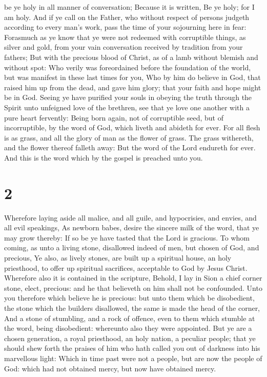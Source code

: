 be ye holy in all manner of conversation;  Because it is
written, Be ye holy; for I am holy.  And if ye call on
the Father, who without respect of persons judgeth according to every
man's work, pass the time of your sojourning here in fear:
 Forasmuch as ye know that ye were not redeemed with
corruptible things, as silver and gold, from your vain conversation
received by tradition from your fathers;  But with the
precious blood of Christ, as of a lamb without blemish and without spot:
 Who verily was foreordained before the foundation of the
world, but was manifest in these last times for you,  Who
by him do believe in God, that raised him up from the dead, and gave him
glory; that your faith and hope might be in God.  Seeing
ye have purified your souls in obeying the truth through the Spirit unto
unfeigned love of the brethren, see that ye love one another with a pure
heart fervently:  Being born again, not of corruptible
seed, but of incorruptible, by the word of God, which liveth and abideth
for ever.  For all flesh is as grass, and all the glory
of man as the flower of grass. The grass withereth, and the flower
thereof falleth away:  But the word of the Lord endureth
for ever. And this is the word which by the gospel is preached unto you.

\hypertarget{section-1}{%
\section{2}\label{section-1}}

 Wherefore laying aside all malice, and all guile, and
hypocrisies, and envies, and all evil speakings,  As
newborn babes, desire the sincere milk of the word, that ye may grow
thereby:  If so be ye have tasted that the Lord is
gracious.  To whom coming, as unto a living stone,
disallowed indeed of men, but chosen of God, and precious,
 Ye also, as lively stones, are built up a spiritual
house, an holy priesthood, to offer up spiritual sacrifices, acceptable
to God by Jesus Christ.  Wherefore also it is contained in
the scripture, Behold, I lay in Sion a chief corner stone, elect,
precious: and he that believeth on him shall not be confounded.
 Unto you therefore which believe he is precious: but unto
them which be disobedient, the stone which the builders disallowed, the
same is made the head of the corner,  And a stone of
stumbling, and a rock of offence, even to them which stumble at the
word, being disobedient: whereunto also they were appointed.
 But ye are a chosen generation, a royal priesthood, an
holy nation, a peculiar people; that ye should shew forth the praises of
him who hath called you out of darkness into his marvellous light:
 Which in time past were not a people, but are now the
people of God: which had not obtained mercy, but now have obtained
mercy.


